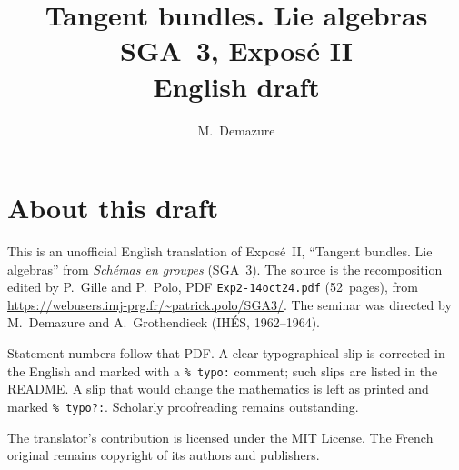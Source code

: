 \documentclass[11pt,a4paper,oneside]{amsbook}
\title[SGA~3, Expos\'e II (English draft)]{Tangent bundles. Lie algebras\\
{\normalsize SGA~3, Expos\'e II\\English draft}}
\author{M.\ Demazure}
\date{}
\begin{document}
\frontmatter
\maketitle

\chapter*{About this draft}
This is an unofficial English translation of Expos\'e~II, ``Tangent bundles. Lie algebras''
from \textit{Sch\'emas en groupes} (SGA~3).
The source is the recomposition edited by P.~Gille and P.~Polo,
PDF \texttt{Exp2-14oct24.pdf} (52~pages),
from \url{https://webusers.imj-prg.fr/~patrick.polo/SGA3/}.
The seminar was directed by M.~Demazure and A.~Grothendieck
(IH\'ES, 1962--1964).

Statement numbers follow that PDF. A clear typographical slip is
corrected in the English and marked with a \texttt{\% typo:} comment;
such slips are listed in the README. A slip that would change the
mathematics is left as printed and marked \texttt{\% typo?:}.
Scholarly proofreading remains outstanding.

The translator's contribution is licensed under the MIT License.
The French original remains copyright of its authors and publishers.

\tableofcontents
\mainmatter








\end{document}
